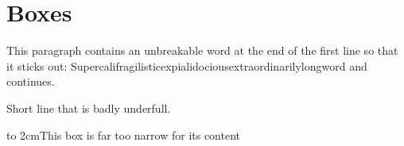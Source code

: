 \documentclass{article}
\begin{document}
\section{Boxes}
This paragraph contains an unbreakable word at the end of the first line so that it sticks out: Supercalifragilisticexpialidociousextraordinarilylongword and continues.

\noindent Short\linebreak
line that is badly underfull.

\hbox to 2cm{This box is far too narrow for its content}



\pagebreak
\end{document}
